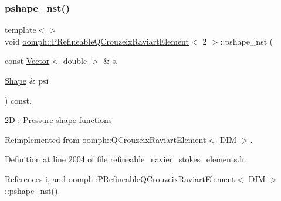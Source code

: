 \mbox{\label{classoomph_1_1PRefineableQCrouzeixRaviartElement_a87afeb50892736eace1e3d68d6c53172}} 
\subsubsection{\texorpdfstring{pshape\+\_\+nst()}{pshape\_nst()}\hspace{0.1cm}{\footnotesize\ttfamily [3/6]}}
{\footnotesize\ttfamily template$<$$>$ \\
void \hyperlink{classoomph_1_1PRefineableQCrouzeixRaviartElement}{oomph\+::\+P\+Refineable\+Q\+Crouzeix\+Raviart\+Element}$<$ 2 $>$\+::pshape\+\_\+nst (\begin{DoxyParamCaption}\item[{const \hyperlink{classoomph_1_1Vector}{Vector}$<$ double $>$ \&}]{s,  }\item[{\hyperlink{classoomph_1_1Shape}{Shape} \&}]{psi }\end{DoxyParamCaption}) const\hspace{0.3cm}{\ttfamily [inline]}, {\ttfamily [virtual]}}

2D \+: Pressure shape functions 

Reimplemented from \hyperlink{classoomph_1_1QCrouzeixRaviartElement_a122c4b7ae47df08a07acd2f1ed6f61b0}{oomph\+::\+Q\+Crouzeix\+Raviart\+Element$<$ D\+I\+M $>$}.



Definition at line 2004 of file refineable\+\_\+navier\+\_\+stokes\+\_\+elements.\+h.



References i, and oomph\+::\+P\+Refineable\+Q\+Crouzeix\+Raviart\+Element$<$ D\+I\+M $>$\+::pshape\+\_\+nst().

\mbox{\label{classoomph_1_1PRefineableQCrouzeixRaviartElement_aa3cf8c270ec40c6d7c507b71dd6676d3}} 
